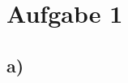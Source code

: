 \documentclass[paper=a4, ngerman]{scrartcl}
\begin{document}
\section{Aufgabe 1}
\subsection{a)}
\end{document}
